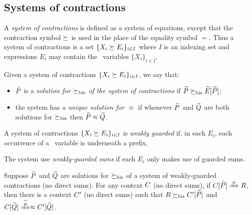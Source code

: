 \subsection{Systems of contractions}
\label{ss:SysContr}

A \emph{system of contractions} is defined as a system of equations,
except that the contraction symbol $\mathrel{\succeq}$ is used in the place of
the equality symbol $=$. Thus a system of contractions is a set 
$\{  X_i \mathrel{\succeq} E_i\}_{i\in I}$
where $I$ is an  indexing set and expressions
$E_i$  may contain the  \behavC\  variables 
$\{  X_i\}_{i\in I}$.

\begin{definition}
\label{d:uniContra}
Given a  system of contractions 
$\{  X_i \mathrel{\succeq} E_i\}_{i\in I}$, 
 we say that:
\begin{itemize}
\item
 $\widetilde P$ is a \emph{solution  for $\mathrel{\succeq_{\rm{bis}}}$ of the 
 system of contractions} 
 if $\widetilde P \mathrel{\succeq_{\rm{bis}}} \widetilde E [\widetilde P]$;
\item 
the system  
has  \emph{a unique 
solution for $\approx$}
if 
whenever 
 $\widetilde P$ and $\widetilde Q$ are both solutions  for  $\mathrel{\succeq_{\rm{bis}}}$
 then $\widetilde P \approx \widetilde Q$.
\end{itemize}
\end{definition}
  


\begin{definition}
\label{d:guarded}
A system of contractions $\{  X_i \mathrel{\succeq} E_i\}_{i\in I}$
 is
\emph{weakly guarded}
if,  in each    $E_i$, each occurrence of
a \behavC\ variable is underneath a prefix.

The system use \emph{weakly-guarded sums} if 
each $E_i$ only makes use of guarded sums.
\end{definition}



 
\begin{lemma}
\label{l:uptocon}
Suppose $\widetilde P$ and $\widetilde Q$ are solutions  for $\mathrel{\succeq_{\rm{bis}}}$
 of a system of weakly-guarded contractions (no direct sums).
For any context $C$ (no direct sums),
if  $\ct{\til P}\Arr{\mu}  R$,
 then 
there is a context $C'$ (no direct sums)
such that $R \mathrel{\succeq_{\rm{bis}}} C' [\widetilde P]$ and  $\ct{\til Q} \Arcap{\mu}
 \wb \ctp{\til Q}$.
\end{lemma}

